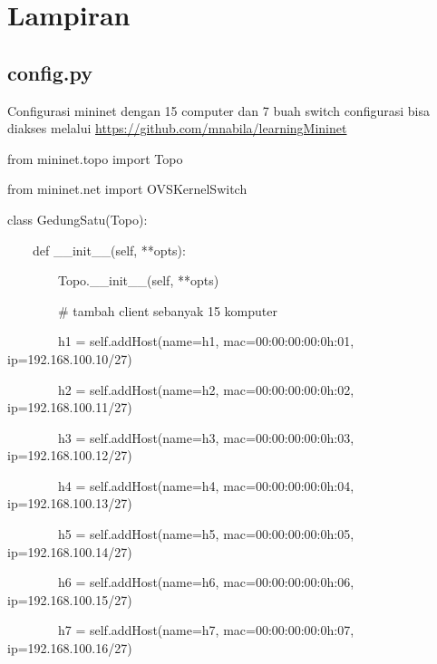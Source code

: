 \section{Lampiran}
\subsection{config.py}
Configurasi mininet dengan 15 computer dan 7 buah switch
configurasi bisa diakses melalui \url{https://github.com/mnabila/learningMininet}

from mininet.topo import Topo

from mininet.net import OVSKernelSwitch

\bigskip

class GedungSatu(Topo):

\ \ \ \ def \_\_init\_\_(self, **opts):

\ \ \ \ \ \ \ \ Topo.\_\_init\_\_(self, **opts)

\bigskip

\ \ \ \ \ \ \ \ \# tambah client sebanyak 15 komputer

\ \ \ \ \ \ \ \ h1 = self.addHost(name={\textquotedbl}h1{\textquotedbl},
mac={\textquotedbl}00:00:00:00:0h:01{\textquotedbl}, ip={\textquotedbl}192.168.100.10/27{\textquotedbl})

\ \ \ \ \ \ \ \ h2 = self.addHost(name={\textquotedbl}h2{\textquotedbl},
mac={\textquotedbl}00:00:00:00:0h:02{\textquotedbl}, ip={\textquotedbl}192.168.100.11/27{\textquotedbl})

\ \ \ \ \ \ \ \ h3 = self.addHost(name={\textquotedbl}h3{\textquotedbl},
mac={\textquotedbl}00:00:00:00:0h:03{\textquotedbl}, ip={\textquotedbl}192.168.100.12/27{\textquotedbl})

\ \ \ \ \ \ \ \ h4 = self.addHost(name={\textquotedbl}h4{\textquotedbl},
mac={\textquotedbl}00:00:00:00:0h:04{\textquotedbl}, ip={\textquotedbl}192.168.100.13/27{\textquotedbl})

\ \ \ \ \ \ \ \ h5 = self.addHost(name={\textquotedbl}h5{\textquotedbl},
mac={\textquotedbl}00:00:00:00:0h:05{\textquotedbl}, ip={\textquotedbl}192.168.100.14/27{\textquotedbl})

\ \ \ \ \ \ \ \ h6 = self.addHost(name={\textquotedbl}h6{\textquotedbl},
mac={\textquotedbl}00:00:00:00:0h:06{\textquotedbl}, ip={\textquotedbl}192.168.100.15/27{\textquotedbl})

\ \ \ \ \ \ \ \ h7 = self.addHost(name={\textquotedbl}h7{\textquotedbl},
mac={\textquotedbl}00:00:00:00:0h:07{\textquotedbl}, ip={\textquotedbl}192.168.100.16/27{\textquotedbl})

